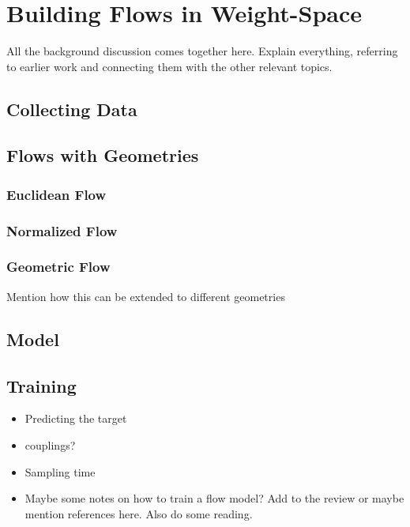 
\chapter{Building Flows in Weight-Space}\label{chapter:method}

{\color{TUMBlue}
All the background discussion comes together here. Explain everything, referring to earlier work and connecting them with the other relevant topics. 
}

\section{Collecting Data}

\section{Flows with Geometries}

\subsection{Euclidean Flow}

\subsection{Normalized Flow}

\subsection{Geometric Flow}

{\color{TUMBlue} Mention how this can be extended to different geometries}

\section{Model}

\section{Training}

\begin{itemize}
    \item Predicting the target 
    \item couplings? 
    \item Sampling time
    \item Maybe some notes on how to train a flow model? Add to the review or maybe mention references here. Also do some reading. 
\end{itemize}

